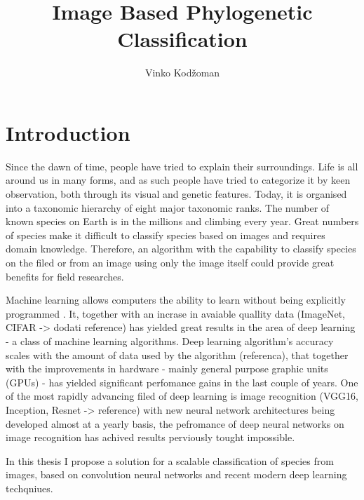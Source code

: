 \documentclass[times, utf8, diplomski]{fer}
\begin{document}
\title{Image Based Phylogenetic Classification}
\author{Vinko Kodžoman}

\maketitle

\izvornik


\tableofcontents

\chapter{Introduction}
Since the dawn of time, people have tried to explain their surroundings. Life is all around us in many forms, and as such people have tried to categorize it by keen observation, both through its visual and genetic features. Today, it is organised into a taxonomic hierarchy of eight major taxonomic ranks. The number of known species on Earth is in the millions and climbing every year. Great numbers of species make it difficult to classify species based on images and requires domain knowledge. Therefore, an algorithm with the capability to classify species on the filed or from an image using only the image itself could provide great benefits for field researches.

Machine learning allows computers the ability to learn without being explicitly programmed \citep{samuel_studies_1959}. It, together with an incrase in avaiable quallity data (ImageNet, CIFAR -> dodati reference) has yielded great results in the area of deep learning - a class of machine learning algorithms. Deep learning algorithm's accuracy scales with the amount of data used by the algorithm (referenca), that together with the improvements in hardware - mainly general purpose graphic units (GPUs) - has yielded significant perfomance gains in the last couple of years. One of the most rapidly advancing filed of deep learning is image recognition (VGG16, Inception, Resnet -> reference) with new neural network architectures being developed almost at a yearly basis, the pefromance of deep neural networks on image recognition has achived results perviously tought 	impossible.

In this thesis I propose a solution for a scalable classification of species from images, based on convolution neural networks and recent modern deep learning techqniues.
\end{document}
